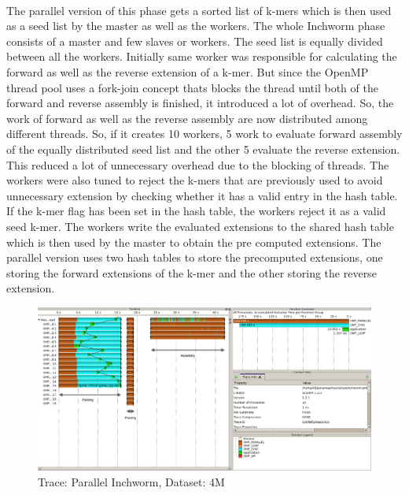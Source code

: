 \label{key}\documentclass[plainarticle, english ,zihtitle,final,hyperref,utf8]{zihpub}
\begin{document}
\paragraph{}
The parallel version of this phase gets a sorted list of k-mers which is then used as a seed list by the master as well as the workers. The whole Inchworm phase consists of a master and few slaves or workers. The seed list is equally divided between all the workers. Initially same worker was responsible for calculating the forward as well as the reverse extension of a k-mer. But since the OpenMP thread pool uses a fork-join concept thats blocks the thread until both of the forward and reverse assembly is finished, it introduced a lot of overhead. So, the work of forward as well as the reverse assembly are now distributed among different threads. So, if it creates 10 workers, 5 work to evaluate forward assembly of the equally distributed seed list and the other 5 evaluate the reverse extension. This reduced a lot of unnecessary overhead due to the blocking of threads. The workers were also tuned to reject the k-mers that are previously used to avoid unnecessary extension by checking whether it has a valid entry in the hash table. If the k-mer flag has been set in the hash table, the workers reject it as a valid seed k-mer. The workers write the evaluated extensions to the shared hash table which is then used by the master to obtain the pre computed extensions. The parallel version uses two hash tables to store the precomputed extensions, one storing the forward extensions of the k-mer and the other storing the reverse extension.
\begin{figure}[h]
\center
\includegraphics[scale=0.27]{trace_parallel_Inchworm}
\caption{Trace: Parallel Inchworm, Dataset: 4M}
\label{assemble-trace}
\end{figure}
\end{document}
